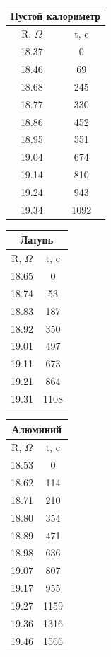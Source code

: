 \documentclass[a4paper,12pt]{article} %
\begin{document}
\begin{tabular}{|c|c|}
\hline
\multicolumn{2}{|c|}{Пустой калориметр} \\
\hline 
R, $\Omega$ & t, c \\ 
\hline
18.37 & 0 \\
\hline 
18.46 & 69 \\ 
\hline 
18.68 & 245 \\ 
\hline 
18.77 & 330 \\ 
\hline 
18.86 & 452 \\ 
\hline 
18.95 & 551 \\ 
\hline 
19.04 & 674 \\ 
\hline 
19.14 & 810 \\ 
\hline 
19.24 & 943 \\ 
\hline 
19.34 & 1092 \\ 

\hline 
\end{tabular} 
\begin{tabular}{|c|c|}
\hline
\multicolumn{2}{|c|}{Латунь      } \\
\hline
R, $\Omega$ & t, c \\ 
\hline 
18.65 & 0 \\ 
\hline 
18.74 & 53 \\ 
\hline 
18.83 & 187 \\ 
\hline 
18.92 & 350 \\ 
\hline 
19.01 & 497 \\ 
\hline 
19.11 & 673 \\ 
\hline 
19.21 & 864 \\ 
\hline 
19.31 & 1108 \\ 

\hline 
\end{tabular} 
\begin{tabular}{|c|c|}
\hline
\multicolumn{2}{|c|}{Алюминий      } \\
\hline
R, $\Omega$ & t, c \\ 
\hline 
18.53 & 0 \\ 
\hline 
18.62 & 114 \\ 
\hline 
18.71 & 210 \\ 
\hline 
18.80 & 354 \\ 
\hline 
18.89 & 471 \\ 
\hline 
18.98 & 636 \\ 
\hline 
19.07 & 807 \\ 
\hline 
19.17 & 955 \\ 
\hline 
19.27 & 1159 \\ 
\hline 
19.36 & 1316 \\ 
\hline 
19.46 & 1566 \\ 
\hline 
\end{tabular} 
\end{document}
